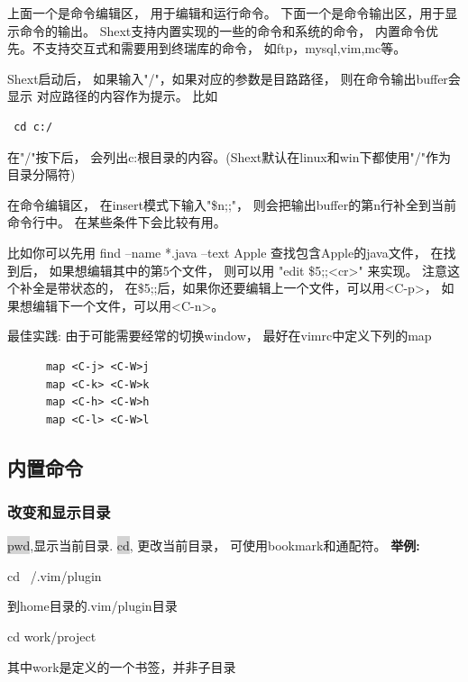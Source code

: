 \documentclass[oneside,openany]{book}
\begin{document}
  上面一个是命令编辑区， 用于编辑和运行命令。 下面一个是命令输出区，用于显示命令的输出。
Shext支持内置实现的一些的命令和系统的命令， 内置命令优先。不支持交互式和需要用到终瑞库的命令， 如ftp，mysql,vim,mc等。 

  Shext启动后， 如果输入"/"，如果对应的参数是目路路径， 则在命令输出buffer会显示
对应路径的内容作为提示。 比如 
  \begin{verbatim} cd c:/ \end{verbatim}
 在"/"按下后， 会列出c:根目录的内容。(Shext默认在linux和win下都使用"/"作为目录分隔符)

  在命令编辑区， 在insert模式下输入"\$n;;"， 则会把输出buffer的第n行补全到当前命令行中。
在某些条件下会比较有用。

  比如你可以先用 find --name *.java --text Apple 查找包含Apple的java文件， 在找到后，
如果想编辑其中的第5个文件， 则可以用 "edit \$5;;<cr>" 来实现。 注意这个补全是带状态的，
在\$5;;后，如果你还要编辑上一个文件，可以用<C-p>， 如果想编辑下一个文件，可以用<C-n>。

  \begin{mdframed}[style=BestPracticeFrame]
  最佳实践: 由于可能需要经常的切换window， 最好在vimrc中定义下列的map
    \begin{verbatim}
      map <C-j> <C-W>j
      map <C-k> <C-W>k
      map <C-h> <C-W>h
      map <C-l> <C-W>l
    \end{verbatim}
  \end{mdframed}


  \subsection{内置命令}

  \subsubsection{改变和显示目录}
    \colorbox{lightgray}{pwd},显示当前目录.  \colorbox{lightgray}{cd}, 更改当前目录， 可使用bookmark和通配符。
    \newline
    \textbf{举例:}
    \begin{mdframed}[style=SmallFrame] cd ~/.vim/plugin \end{mdframed}
    \vspace{0.1mm}
    到home目录的.vim/plugin目录

    \begin{mdframed}[style=SmallFrame] cd work/project \end{mdframed}
    \vspace{0.1mm}
     其中work是定义的一个书签，并非子目录
\end{document}
